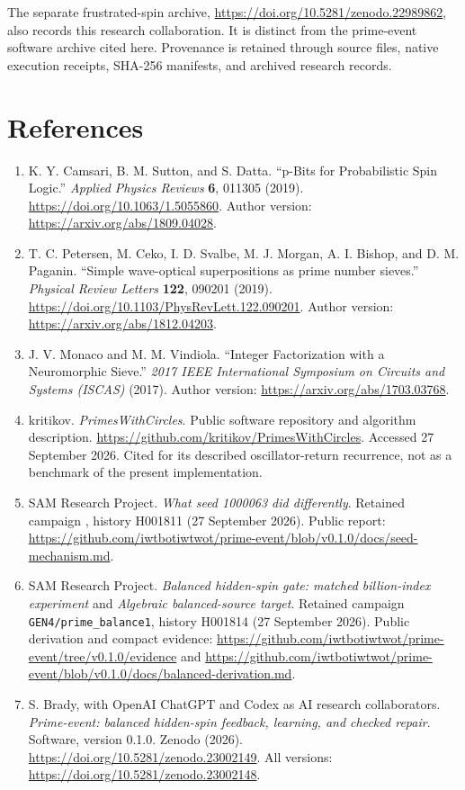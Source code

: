 \documentclass[
  11pt,
]{article}
\begin{document}
The separate frustrated-spin archive,
\url{https://doi.org/10.5281/zenodo.22989862}, also records this
research collaboration. It is distinct from the prime-event software
archive cited here. Provenance is retained through source files, native
execution receipts, SHA-256 manifests, and archived research records.

\section{References}\label{references}

\begin{enumerate}
\def\labelenumi{\arabic{enumi}.}
\item
  K. Y. Camsari, B. M. Sutton, and S. Datta. ``p-Bits for Probabilistic
  Spin Logic.'' \emph{Applied Physics Reviews} \textbf{6}, 011305
  (2019). \url{https://doi.org/10.1063/1.5055860}. Author version:
  \url{https://arxiv.org/abs/1809.04028}.
\item
  T. C. Petersen, M. Ceko, I. D. Svalbe, M. J. Morgan, A. I. Bishop, and
  D. M. Paganin. ``Simple wave-optical superpositions as prime number
  sieves.'' \emph{Physical Review Letters} \textbf{122}, 090201 (2019).
  \url{https://doi.org/10.1103/PhysRevLett.122.090201}. Author version:
  \url{https://arxiv.org/abs/1812.04203}.
\item
  J. V. Monaco and M. M. Vindiola. ``Integer Factorization with a
  Neuromorphic Sieve.'' \emph{2017 IEEE International Symposium on
  Circuits and Systems (ISCAS)} (2017). Author version:
  \url{https://arxiv.org/abs/1703.03768}.
\item
  kritikov. \emph{PrimesWithCircles}. Public software repository and
  algorithm description.
  \url{https://github.com/kritikov/PrimesWithCircles}. Accessed 27
  September 2026. Cited for its described oscillator-return recurrence,
  not as a benchmark of the present implementation.
\item
  SAM Research Project. \emph{What seed 1000063 did differently}.
  Retained campaign \texttt{}, history
  H001811 (27 September 2026). Public report:
  \url{https://github.com/iwtbotiwtwot/prime-event/blob/v0.1.0/docs/seed-mechanism.md}.
\item
  SAM Research Project. \emph{Balanced hidden-spin gate: matched
  billion-index experiment} and \emph{Algebraic balanced-source target}.
  Retained campaign \texttt{GEN4/prime\_balance1}, history H001814 (27
  September 2026). Public derivation and compact evidence:
  \url{https://github.com/iwtbotiwtwot/prime-event/tree/v0.1.0/evidence}
  and
  \url{https://github.com/iwtbotiwtwot/prime-event/blob/v0.1.0/docs/balanced-derivation.md}.
\item
  S. Brady, with OpenAI ChatGPT and Codex as AI research collaborators.
  \emph{Prime-event: balanced hidden-spin feedback, learning, and
  checked repair}. Software, version 0.1.0. Zenodo (2026).
  \url{https://doi.org/10.5281/zenodo.23002149}. All versions:
  \url{https://doi.org/10.5281/zenodo.23002148}.
\end{enumerate}
\end{document}
